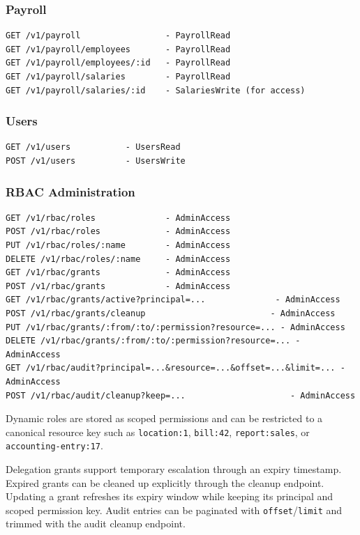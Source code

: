 \subsubsection{Payroll}\label{payroll-1}

\begin{verbatim}
GET /v1/payroll                 - PayrollRead
GET /v1/payroll/employees       - PayrollRead
GET /v1/payroll/employees/:id   - PayrollRead
GET /v1/payroll/salaries        - PayrollRead
GET /v1/payroll/salaries/:id    - SalariesWrite (for access)
\end{verbatim}

\subsubsection{Users}\label{users}

\begin{verbatim}
GET /v1/users           - UsersRead
POST /v1/users          - UsersWrite
\end{verbatim}

\subsubsection{RBAC Administration}\label{rbac-administration}

\begin{verbatim}
GET /v1/rbac/roles              - AdminAccess
POST /v1/rbac/roles             - AdminAccess
PUT /v1/rbac/roles/:name        - AdminAccess
DELETE /v1/rbac/roles/:name     - AdminAccess
GET /v1/rbac/grants             - AdminAccess
POST /v1/rbac/grants            - AdminAccess
GET /v1/rbac/grants/active?principal=...              - AdminAccess
POST /v1/rbac/grants/cleanup                         - AdminAccess
PUT /v1/rbac/grants/:from/:to/:permission?resource=... - AdminAccess
DELETE /v1/rbac/grants/:from/:to/:permission?resource=... - AdminAccess
GET /v1/rbac/audit?principal=...&resource=...&offset=...&limit=... - AdminAccess
POST /v1/rbac/audit/cleanup?keep=...                     - AdminAccess
\end{verbatim}

Dynamic roles are stored as scoped permissions and can be restricted to
a canonical resource key such as \texttt{location:1}, \texttt{bill:42},
\texttt{report:sales}, or \texttt{accounting-entry:17}.

Delegation grants support temporary escalation through an expiry
timestamp. Expired grants can be cleaned up explicitly through the
cleanup endpoint. Updating a grant refreshes its expiry window while
keeping its principal and scoped permission key. Audit entries can be
paginated with \texttt{offset}/\texttt{limit} and trimmed with the audit
cleanup endpoint.

